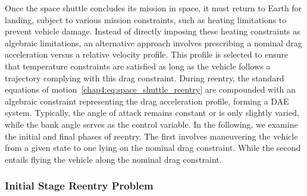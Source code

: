 Once the space shuttle concludes its mission in space, it must return to Earth for landing, subject to various mission constraints, such as heating limitations to prevent vehicle damage. Instead of directly imposing these heating constraints as algebraic limitations, an alternative approach involves prescribing a nominal drag acceleration versus a relative velocity profile. This profile is selected to ensure that temperature constraints are satisfied as long as the vehicle follows a trajectory complying with this drag constraint. During reentry, the standard equations of motion~\eqref{chap4:eq:space_shuttle_reentry} are compounded with an algebraic constraint representing the drag acceleration profile, forming a \ac{DAE} system. Typically, the angle of attack remains constant or is only slightly varied, while the bank angle serves as the control variable. In the following, we examine the initial and final phases of reentry. The first involves maneuvering the vehicle from a given state to one lying on the nominal drag constraint. While the second entails flying the vehicle along the nominal drag constraint.

\subsubsection{Initial Stage Reentry Problem}

